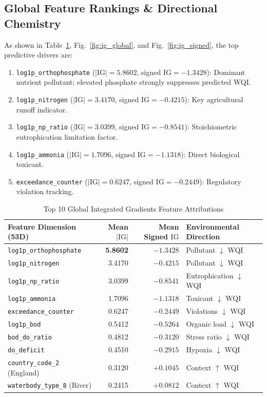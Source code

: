 \documentclass[conference]{IEEEtran}
\begin{document}
\subsection{Global Feature Rankings \& Directional Chemistry}
As shown in Table~\ref{tab:ig_rankings}, Fig.~\ref{fig:ig_global}, and Fig.~\ref{fig:ig_signed},
the top predictive drivers are:
\begin{enumerate}
  \item \texttt{log1p\_orthophosphate} ($|\text{IG}| = 5.8602$, signed $\text{IG} = -1.3428$):
        Dominant nutrient pollutant; elevated phosphate strongly suppresses predicted WQI.
  \item \texttt{log1p\_nitrogen} ($|\text{IG}| = 3.4170$, signed $\text{IG} = -0.4215$):
        Key agricultural runoff indicator.
  \item \texttt{log1p\_np\_ratio} ($|\text{IG}| = 3.0399$, signed $\text{IG} = -0.8541$):
        Stoichiometric eutrophication limitation factor.
  \item \texttt{log1p\_ammonia} ($|\text{IG}| = 1.7096$, signed $\text{IG} = -1.1318$):
        Direct biological toxicant.
  \item \texttt{exceedance\_counter} ($|\text{IG}| = 0.6247$, signed $\text{IG} = -0.2449$):
        Regulatory violation tracking.
\end{enumerate}

\begin{table}[!t]
  \caption{Top 10 Global Integrated Gradients Feature Attributions}
  \label{tab:ig_rankings}
  \centering
  \setlength{\tabcolsep}{3pt}
  \scriptsize
  \begin{tabular}{lrrl}
    \toprule
    \textbf{Feature Dimension (53D)} & \textbf{Mean $|\text{IG}|$} & \textbf{Mean Signed $\text{IG}$} & \textbf{Environmental Direction} \\
    \midrule
    \texttt{log1p\_orthophosphate} & \textbf{5.8602} & $-1.3428$ & Pollutant $\downarrow$ WQI \\
    \texttt{log1p\_nitrogen}       & 3.4170 & $-0.4215$ & Pollutant $\downarrow$ WQI \\
    \texttt{log1p\_np\_ratio}      & 3.0399 & $-0.8541$ & Eutrophication $\downarrow$ WQI \\
    \texttt{log1p\_ammonia}        & 1.7096 & $-1.1318$ & Toxicant $\downarrow$ WQI \\
    \texttt{exceedance\_counter}   & 0.6247 & $-0.2449$ & Violations $\downarrow$ WQI \\
    \texttt{log1p\_bod}            & 0.5412 & $-0.5264$ & Organic load $\downarrow$ WQI \\
    \texttt{bod\_do\_ratio}        & 0.4812 & $-0.3120$ & Stress ratio $\downarrow$ WQI \\
    \texttt{do\_deficit}           & 0.4510 & $-0.2915$ & Hypoxia $\downarrow$ WQI \\
    \texttt{country\_code\_2} (England) & 0.3120 & $+0.1045$ & Context $\uparrow$ WQI \\
    \texttt{waterbody\_type\_8} (River) & 0.2415 & $+0.0812$ & Context $\uparrow$ WQI \\
    \bottomrule
  \end{tabular}
\end{table}
\end{document}
